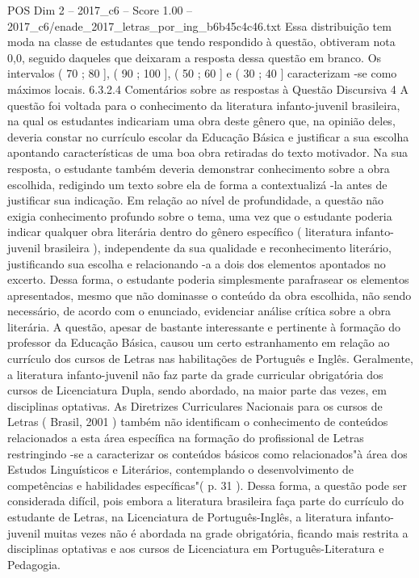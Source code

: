 \begin{textsample}{POS Dim 2 – 2017\_c6 – Score 1.00 – 2017\_c6/enade\_2017\_letras\_por\_ing\_b6b45c4c46.txt}
Essa distribuição tem moda na classe de estudantes que tendo respondido à questão, obtiveram nota 0,0, seguido daqueles que deixaram a resposta dessa questão em branco.
Os intervalos ( 70 ; 80 ], ( 90 ; 100 ], ( 50 ; 60 ] e ( 30 ; 40 ] caracterizam -se como máximos locais. 6.3.2.4 Comentários sobre as respostas à Questão Discursiva 4 A questão foi voltada para o conhecimento da literatura infanto-juvenil brasileira, na qual os estudantes indicariam uma obra deste gênero que, na opinião deles, deveria constar no currículo escolar da Educação Básica e justificar a sua escolha apontando características de uma boa obra retiradas do texto motivador.
Na sua resposta, o estudante também deveria demonstrar conhecimento sobre a obra escolhida, redigindo um texto sobre ela de forma a contextualizá -la antes de justificar sua indicação.
Em relação ao nível de profundidade, a questão não exigia conhecimento profundo sobre o tema, uma vez que o estudante poderia indicar qualquer obra literária dentro do gênero específico ( literatura infanto-juvenil brasileira ), independente da sua qualidade e reconhecimento literário, justificando sua escolha e relacionando -a a dois dos elementos apontados no excerto.
Dessa forma, o estudante poderia simplesmente parafrasear os elementos apresentados, mesmo que não dominasse o conteúdo da obra escolhida, não sendo necessário, de acordo com o enunciado, evidenciar análise crítica sobre a obra literária.
A questão, apesar de bastante interessante e pertinente à formação do professor da Educação Básica, causou um certo estranhamento em relação ao currículo dos cursos de Letras nas habilitações de Português e Inglês.
Geralmente, a literatura infanto-juvenil não faz parte da grade curricular obrigatória dos cursos de Licenciatura Dupla, sendo abordado, na maior parte das vezes, em disciplinas optativas.
As Diretrizes Curriculares Nacionais para os cursos de Letras ( Brasil, 2001 ) também não identificam o conhecimento de conteúdos relacionados a esta área específica na formação do profissional de Letras restringindo -se a caracterizar os conteúdos básicos como relacionados"à área dos Estudos Linguísticos e Literários, contemplando o desenvolvimento de competências e habilidades específicas"( p. 31 ).
Dessa forma, a questão pode ser considerada difícil, pois embora a literatura brasileira faça parte do currículo do estudante de Letras, na Licenciatura de Português-Inglês, a literatura infanto-juvenil muitas vezes não é abordada na grade obrigatória, ficando mais restrita a disciplinas optativas e aos cursos de Licenciatura em Português-Literatura e Pedagogia.

\end{textsample}
